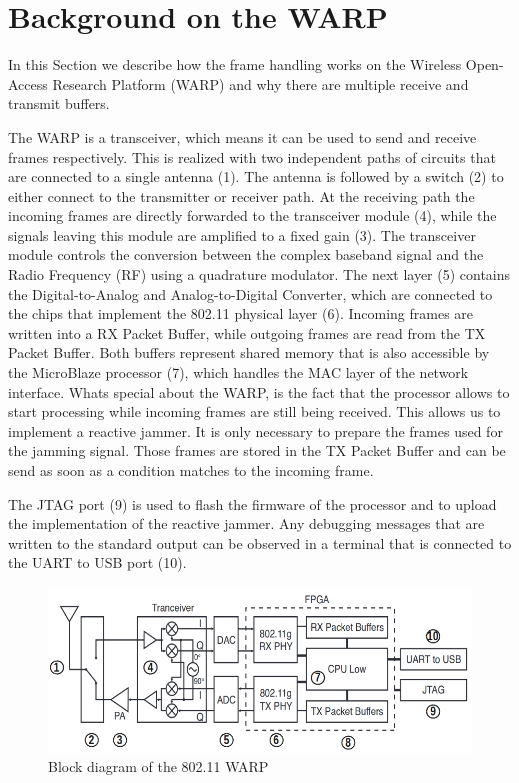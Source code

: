 \documentclass[sigconf]{acmart}
\begin{document}
\section{Background on the WARP}
In this Section we describe how the frame handling works on the Wireless Open-Access
Research Platform (WARP) and why there are multiple receive and transmit buffers.

The WARP is a transceiver, which means it can be used to send and receive frames respectively. This
is realized with two independent paths of circuits that are connected to a single antenna (1). 
The antenna is followed by a switch (2) to either connect to the transmitter or receiver
path. At the receiving path the incoming frames are directly forwarded to the transceiver module
(4), while the signals leaving this module are amplified to a fixed gain (3). The transceiver module
controls the conversion between the complex baseband signal and the Radio Frequency (RF) using a
quadrature modulator. The next layer (5) contains the Digital-to-Analog and Analog-to-Digital
Converter, which are connected to the chips that implement the 802.11 physical layer (6). Incoming
frames are written into a RX Packet Buffer, while outgoing frames are read from the TX Packet
Buffer. Both buffers represent shared memory that is also accessible by the MicroBlaze processor (7),
which handles the MAC layer of the network interface. Whats special about the WARP, is the fact that
the processor allows to start processing while incoming frames are still being received. This
allows us to implement a reactive jammer. It is only necessary to prepare the frames used for the
jamming signal. Those frames are stored in the TX Packet Buffer and can be send as soon as a
condition matches to the incoming frame.

The JTAG port (9) is used to flash the firmware of the processor and to upload the implementation of
the reactive jammer. Any debugging messages that are written to the standard output can be observed
in a terminal that is connected to the UART to USB port (10).

\begin{figure}[tb!]
	\hfill
	\includegraphics[width=1\linewidth]{block_diagram_warp.png}
	\caption{Block diagram of the 802.11 WARP}
	\label{fig:block_diagram_warp}
\end{figure}
\end{document}
